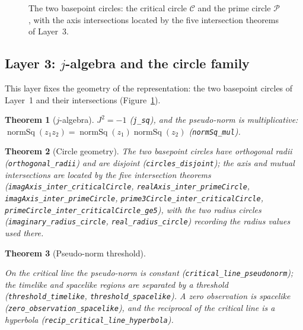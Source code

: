 \documentclass{article}
\newtheorem{theorem}{Theorem}[section]
\begin{document}
\begin{figure}[h]
\centering
{}
\caption{The two basepoint circles: the critical circle $\mathcal{C}$ and
the prime circle $\mathcal{P}$, with the axis intersections located by the
five intersection theorems of Layer~3.}
\label{fig:circles}
\end{figure}

\subsection{Layer 3: $j$-algebra and the circle family}
\label{sec:L3a}

This layer fixes the geometry of the representation: the two basepoint
circles of Layer~1 and their intersections (Figure~\ref{fig:circles}).

\begin{theorem}[$j$-algebra]
\label{thm:jalg}
$J^2=-1$ (\texttt{j\_sq}), and the pseudo-norm is multiplicative:
$\operatorname{normSq}(z_1z_2)=\operatorname{normSq}(z_1)\operatorname{normSq}(z_2)$
(\texttt{normSq\_mul}).
\end{theorem}

\begin{theorem}[Circle geometry]
\label{thm:circles}
The two basepoint circles have orthogonal radii
(\texttt{orthogonal\_radii}) and are disjoint (\texttt{circles\_disjoint});
the axis and mutual intersections are located by the five intersection
theorems (\texttt{imagAxis\_inter\_criticalCircle},
\texttt{realAxis\_inter\_primeCircle},
\texttt{imagAxis\_inter\_primeCircle},
\texttt{prime3Circle\_inter\_criticalCircle},
\texttt{primeCircle\_inter\_criticalCircle\_ge5}), with the two radius
circles (\texttt{imaginary\_radius\_circle}, \texttt{real\_radius\_circle})
recording the radius values used there.
\end{theorem}

\begin{theorem}[Pseudo-norm threshold]
\label{thm:threshold}
\begin{sloppypar}On the critical line the pseudo-norm is constant
(\texttt{critical\_line\_pseudonorm}); the timelike and spacelike regions
are separated by a threshold
(\texttt{threshold\_timelike}, \texttt{threshold\_spacelike}). A zero
observation is spacelike (\texttt{zero\_observation\_spacelike}), and the
reciprocal of the critical line is a hyperbola
(\texttt{recip\_critical\_line\_hyperbola}).\end{sloppypar}
\end{theorem}
\end{document}
